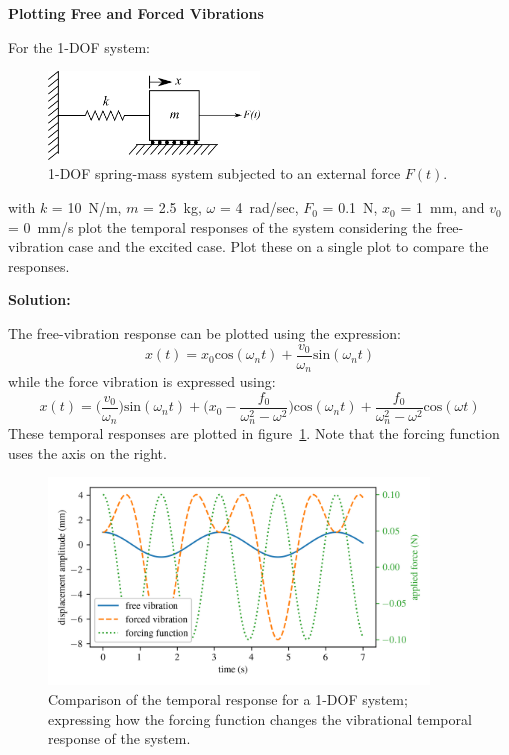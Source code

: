 \documentclass[12pt,letter]{article}
\begin{document}
	\begin{example}

	\textbf{Plotting Free and Forced Vibrations}

	\noindent For the 1-DOF system:
		\begin{figure}[H]
			\centering
			\includegraphics[width=0.5\textwidth]{../figures/1-DOF-spring_mass_horizontal_forced.png}
			\caption{1-DOF spring-mass system subjected to an external force $F(t)$.}
		\end{figure}
		\noindent with $k$ = 10~N/m, $m$ = 2.5~kg, $\omega$ = 4~rad/sec, $F_0$ = 0.1~N, $x_0$ = 1~mm, and $v_0$ = 0~mm/s plot the temporal responses of the system considering the free-vibration case and the excited case. Plot these on a single plot to compare the responses. 
					
		\noindent\textbf{Solution:} 

		\noindent  The free-vibration response can be plotted using the expression:
		\begin{equation}
			x(t) = x_0\text{cos}(\omega_n t) + \frac{v_0}{\omega_n}\text{sin}(\omega_n t)
		\end{equation}				
		while the force vibration is expressed using:
		\begin{equation}
			x(t) = \Big(\frac{v_0}{\omega_n}\Big)\text{sin}(\omega_n t) + \Big(x_0-\frac{f_0}{\omega_n^2-\omega^2}\Big)\text{cos}(\omega_n t) + \frac{f_0}{\omega_n^2-\omega^2}\text{cos}(\omega t)
		\end{equation}	
		These temporal responses are plotted in figure~\ref{fig:free_and_forced_temporal_response}. Note that the forcing function uses the axis on the right.
		\begin{figure}[H]
			\centering
			\includegraphics[width=0.9\textwidth]{../figures/free_and_forced_temporal_response.png}
			\caption{Comparison of the temporal response for a 1-DOF system; expressing how the forcing function changes the vibrational  temporal response of the system.}
			\label{fig:free_and_forced_temporal_response}
		\end{figure}	
	\end{example}
	
\end{document}
